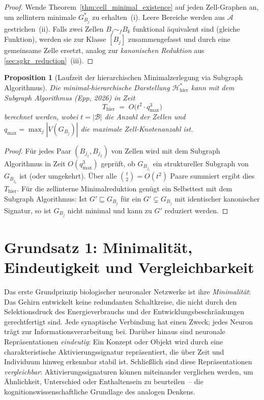 \documentclass[12pt, a4paper, openany]{report}
\newtheorem{proposition}[theorem]{Proposition}
\newcommand{\calH}{\mathcal{H}}
\newcommand{\calA}{\mathcal{A}}
\newcommand{\calB}{\mathcal{B}}
\begin{document}
\begin{proof}
Wende Theorem~\ref{thm:cell_minimal_existence} auf jeden Zell-Graphen an,
um zellintern minimale $G^*_{B_j}$ zu erhalten~(i).  Leere Bereiche werden
aus $\calA$ gestrichen~(ii).  Falls zwei Zellen $B_j \sim_f B_k$ funktional
äquivalent sind (gleiche Funktion), werden sie zur Klasse $[B_j]$ zusammengefasst
und durch eine gemeinsame Zelle ersetzt, analog zur \emph{kanonischen Reduktion}
aus \cref{sec:sgkr_reduction}~(iii).
\end{proof}

\begin{proposition}[Laufzeit der hierarchischen Minimalzerlegung via Subgraph Algorithmus]
\label{prop:hierarchy_runtime}
Die minimal-hierarchische Darstellung $\calH^*_{\mathrm{hier}}$ kann mit dem
Subgraph Algorithmus (Epp, 2026) in Zeit
\[
  T_{\mathrm{hier}}
  \;=\;
  O\!\bigl(t^2 \cdot q_{\max}^3\bigr)
\]
berechnet werden, wobei $t = |\calB|$ die Anzahl der Zellen und
$q_{\max} = \max_j |V(G_{B_j})|$ die maximale Zell-Knotenanzahl ist.
\end{proposition}

\begin{proof}
Für jedes Paar $(B_{j_1}, B_{j_2})$ von Zellen wird mit dem Subgraph
Algorithmus in Zeit $O(q_{\max}^3)$ geprüft, ob $G_{B_{j_1}}$ ein
struktureller Subgraph von $G_{B_{j_2}}$ ist (oder umgekehrt).  Über alle
$\binom{t}{2} = O(t^2)$ Paare summiert ergibt dies $T_{\mathrm{hier}}$.
Für die zellinterne Minimalreduktion genügt ein Selbsttest mit dem
Subgraph Algorithmus: Ist $G' \sqsubseteq G_{B_j}$ für ein $G' \subsetneq G_{B_j}$
mit identischer kanonischer Signatur, so ist $G_{B_j}$ nicht minimal und
kann zu $G'$ reduziert werden.
\end{proof}

\section{Grundsatz 1: Minimalität, Eindeutigkeit und Vergleichbarkeit}
\label{sec:bio_minimal}

Das erste Grundprinzip biologischer neuronaler Netzwerke ist ihre
\emph{Minimalität}: Das Gehirn entwickelt keine redundanten Schaltkreise,
die nicht durch den Selektionsdruck des Energieverbrauchs und der
Entwicklungsbeschränkungen gerechtfertigt sind.  Jede synaptische Verbindung
hat einen Zweck; jedes Neuron trägt zur Informationsverarbeitung bei.  Darüber
hinaus sind neuronale Repräsentationen \emph{eindeutig}: Ein Konzept oder Objekt
wird durch eine charakteristische Aktivierungssignatur repräsentiert, die
über Zeit und Individuum hinweg erkennbar stabil ist.  Schließlich sind diese
Repräsentationen \emph{vergleichbar}: Aktivierungssignaturen können
miteinander verglichen werden, um Ähnlichkeit, Unterschied oder
Enthaltensein zu beurteilen~-- die kognitionswissenschaftliche Grundlage
des analogen Denkens.
\end{document}
